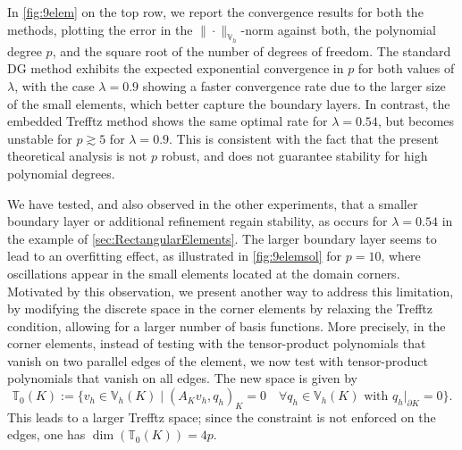 \documentclass[a4paper,twoside,10pt]{article}
\renewcommand{\dim}{\operatorname{dim}}
\newcommand{\inner}[1]{( #1 )}
\newcommand{\IT}{\mathbb{T}}
\numberwithin{equation}{section}
\newcommand{\Vh}{\mathbb{V}_{\! h}}
\begin{document}
In \cref{fig:9elem} on the top row, we report the convergence results for both the methods, plotting the error in the $\|\cdot\|_{\Vh}$-norm against both, the polynomial degree $p$, and the square root of the number of degrees of freedom.
The standard DG method exhibits the expected exponential convergence in $p$ for both values of $\lambda$, with the case $\lambda=0.9$ showing a faster convergence rate due to the larger size of the small elements, which better capture the boundary layers.
In contrast, the embedded Trefftz method shows the same optimal rate for $\lambda=0.54$, but becomes unstable for $p \gtrsim 5$ for $\lambda=0.9$.
This is consistent with the fact that the present theoretical analysis is not $p$ robust, and does not guarantee stability for high polynomial degrees.

We have tested, and also
observed in the other experiments, that a smaller boundary layer or additional refinement 
regain stability, as
occurs for $\lambda=0.54$
in the example 
of \cref{sec:RectangularElements}.
The larger boundary layer seems to lead to an overfitting effect, as illustrated in \cref{fig:9elemsol} for $p=10$, where oscillations appear in the small elements located at the domain corners.
Motivated by this observation, we present another way to address this limitation, by modifying the discrete space in the corner elements by relaxing the Trefftz condition, allowing for a larger number of basis functions.
More precisely, in the corner elements, instead of testing with the tensor-product polynomials that vanish on two parallel edges of the element, we now test with tensor-product polynomials that vanish on all edges.
The new space is given by
\begin{equation*}
    \IT_0(K) := \{ v_h\in \Vh(K) \mid \inner{A_K v_h,q_h}_{K} = 0 \quad \forall q_h\in \Vh(K) \text{ with } q_h|_{\partial K}=0 \}.
\end{equation*}
This leads to a larger Trefftz space; 
since the constraint is not enforced on the edges, one has $\dim(\IT_0(K)) = 4p$.
\end{document}
